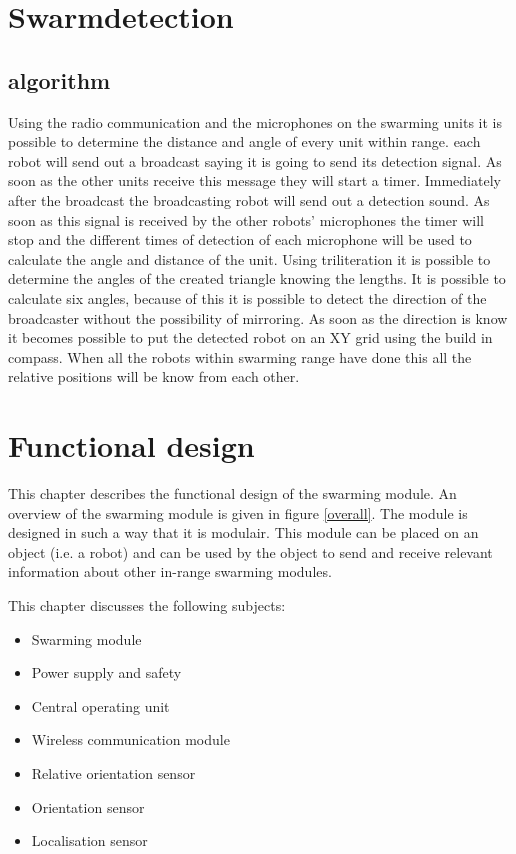 \documentclass[10pt,a4paper]{article}
\begin{document}
\section{Swarmdetection}
\subsection{algorithm}
Using the radio communication and the microphones on the swarming units it is possible to determine the distance and angle of every unit within range. each robot will send out a broadcast saying it is going to send its detection signal. As soon as the other units receive this message they will start a timer. Immediately after the broadcast the broadcasting robot will send out a detection sound. As soon as this signal is received by the other robots' microphones the timer will stop and the different times of detection of each microphone will be used to calculate the angle and distance of the unit.
Using triliteration it is possible to determine the angles of the created triangle knowing the lengths. It is possible to calculate six angles, because of this it is possible to detect the direction of the broadcaster without the possibility of mirroring. As soon as the direction is know it becomes possible to put the detected robot on an XY grid using the build in compass. When all the robots within swarming range have done this all the relative positions will be know from each other.
\newpage

\section{Functional design}

This chapter describes the functional design of the swarming module. An overview of the swarming module is given in figure \ref{overall}. The module is designed in such a way that it is modulair. This module can be placed on an object (i.e. a robot) and can be used by the object to send and receive relevant information about other in-range swarming modules.

This chapter discusses the following subjects:
\begin{itemize}
\setlength\itemsep{0em}
\item Swarming module
\item Power supply and safety
\item Central operating unit
\item Wireless communication module
\item Relative orientation sensor
\item Orientation sensor
\item Localisation sensor
\end{itemize}
\end{document}

